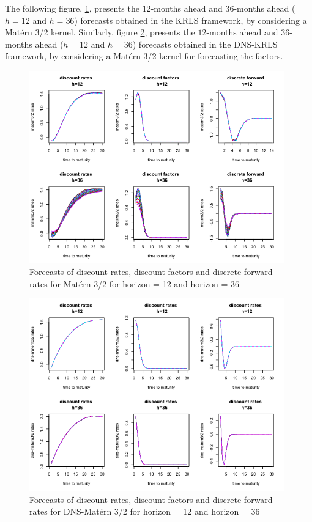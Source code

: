The following figure, \ref{fcast_matern32}, presents the $12$-months ahead and $36$-months ahead ($h = 12$ and $h = 36$) forecasts obtained in the KRLS framework, by considering a Mat\'ern 3/2 kernel. Similarly, figure \ref{fcast_ns_matern32}, presents the $12$-months ahead and $36$-months ahead ($h = 12$ and $h = 36$) forecasts obtained in the DNS-KRLS framework, by considering a Mat\'ern 3/2 kernel for forecasting the factors. 

\begin{figure}[!htb]
\centering
\includegraphics[width=11cm]{gfx/chapter-krls-models/fcast_matern32}
\caption{Forecasts of discount rates, discount factors and discrete forward rates for Mat\'ern 3/2 for horizon = 12 and horizon = 36}
\label{fcast_matern32}
\end{figure}

\begin{figure}[!htb]
\centering
\includegraphics[width=11cm]{gfx/chapter-krls-models/fcast_ns_matern32}
\caption{Forecasts of discount rates, discount factors and discrete forward rates for DNS-Mat\'ern 3/2 for horizon = 12 and horizon = 36}
\label{fcast_ns_matern32}
\end{figure}

